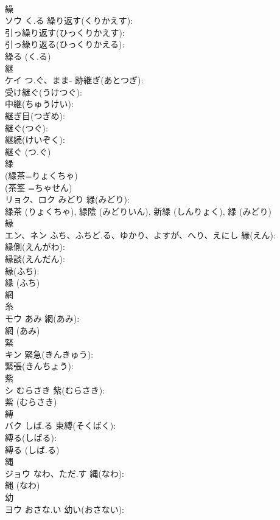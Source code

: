 \documentclass[8pt]{extreport}
\begin{document}
\begin{CJK}{UTF8}{min}
\\	繰			
\\	ソウ	く.る	繰り返す(くりかえす): 
\\	引っ繰り返す(ひっくりかえす): 
\\	引っ繰り返る(ひっくりかえる): 
\\	繰る (く.る)
\\	継			
\\	ケイ	つ.ぐ、まま-	跡継ぎ(あとつぎ): 
\\	受け継ぐ(うけつぐ): 
\\	中継(ちゅうけい): 
\\	継ぎ目(つぎめ): 
\\	継ぐ(つぐ): 
\\	継続(けいぞく): 
\\	継ぐ (つ.ぐ)
\\	緑			
\\	(緑茶=りょくちゃ) 
\\	(茶筌 =ちゃせん) 
\\	リョク、ロク	みどり	緑(みどり): 
\\	緑茶 (りょくちゃ), 緑陰 (みどりいん), 新緑 (しんりょく), 緑 (みどり)
\\	縁			
\\	エン、ネン	ふち、ふちど.る、ゆかり、よすが、へり、えにし	縁(えん): 
\\	縁側(えんがわ): 
\\	縁談(えんだん): 
\\	縁(ふち): 
\\	縁 (ふち)
\\	網			
\\	糸 
\\	モウ	あみ	網(あみ): 
\\	網 (あみ)
\\	緊			
\\	キン		緊急(きんきゅう): 
\\	緊張(きんちょう): 
\\	紫			
\\	シ	むらさき	紫(むらさき): 
\\	紫 (むらさき)
\\	縛			
\\	バク	しば.る	束縛(そくばく): 
\\	縛る(しばる): 
\\	縛る (しば.る)
\\	縄			
\\	ジョウ	なわ、ただ.す	縄(なわ): 
\\	縄 (なわ)
\\	幼			
\\	ヨウ	おさな.い	幼い(おさない): 

\end{CJK}
\end{document}
